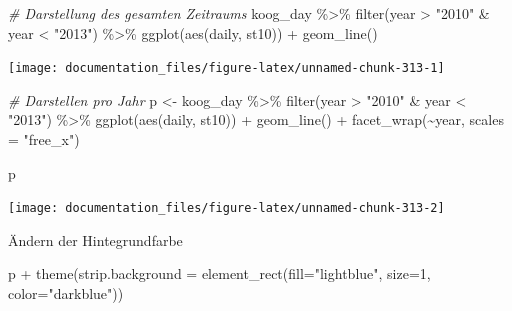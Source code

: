 \documentclass[
]{article}
\newenvironment{Shaded}{\begin{snugshade}}{\end{snugshade}}
\newcommand{\AttributeTok}[1]{\textcolor[rgb]{0.77,0.63,0.00}{#1}}
\newcommand{\CommentTok}[1]{\textcolor[rgb]{0.56,0.35,0.01}{\textit{#1}}}
\newcommand{\DecValTok}[1]{\textcolor[rgb]{0.00,0.00,0.81}{#1}}
\newcommand{\FunctionTok}[1]{\textcolor[rgb]{0.00,0.00,0.00}{#1}}
\newcommand{\NormalTok}[1]{#1}
\newcommand{\OtherTok}[1]{\textcolor[rgb]{0.56,0.35,0.01}{#1}}
\newcommand{\SpecialCharTok}[1]{\textcolor[rgb]{0.00,0.00,0.00}{#1}}
\newcommand{\StringTok}[1]{\textcolor[rgb]{0.31,0.60,0.02}{#1}}
\begin{document}
\begin{Shaded}
\begin{Highlighting}[]
\CommentTok{\# Darstellung des gesamten Zeitraums}
\NormalTok{koog\_day }\SpecialCharTok{\%\textgreater{}\%}
  \FunctionTok{filter}\NormalTok{(year }\SpecialCharTok{\textgreater{}} \StringTok{"2010"} \SpecialCharTok{\&}\NormalTok{ year }\SpecialCharTok{\textless{}} \StringTok{"2013"}\NormalTok{) }\SpecialCharTok{\%\textgreater{}\%}
  \FunctionTok{ggplot}\NormalTok{(}\FunctionTok{aes}\NormalTok{(daily, st10)) }\SpecialCharTok{+}
  \FunctionTok{geom\_line}\NormalTok{()}
\end{Highlighting}
\end{Shaded}

\begin{center}\texttt{[image: documentation\_files/figure-latex/unnamed-chunk-313-1]} \end{center}

\begin{Shaded}
\begin{Highlighting}[]

\CommentTok{\# Darstellen pro Jahr}
\NormalTok{p }\OtherTok{\textless{}{-}}\NormalTok{ koog\_day }\SpecialCharTok{\%\textgreater{}\%}
  \FunctionTok{filter}\NormalTok{(year }\SpecialCharTok{\textgreater{}} \StringTok{"2010"} \SpecialCharTok{\&}\NormalTok{ year }\SpecialCharTok{\textless{}} \StringTok{"2013"}\NormalTok{) }\SpecialCharTok{\%\textgreater{}\%}
  \FunctionTok{ggplot}\NormalTok{(}\FunctionTok{aes}\NormalTok{(daily, st10)) }\SpecialCharTok{+}
  \FunctionTok{geom\_line}\NormalTok{() }\SpecialCharTok{+}
  \FunctionTok{facet\_wrap}\NormalTok{(}\SpecialCharTok{\textasciitilde{}}\NormalTok{year, }\AttributeTok{scales =} \StringTok{"free\_x"}\NormalTok{)}

\NormalTok{p}
\end{Highlighting}
\end{Shaded}

\begin{center}\texttt{[image: documentation\_files/figure-latex/unnamed-chunk-313-2]} \end{center}

Ändern der Hintegrundfarbe

\begin{Shaded}
\begin{Highlighting}[]
\NormalTok{p }\SpecialCharTok{+} \FunctionTok{theme}\NormalTok{(}\AttributeTok{strip.background =} \FunctionTok{element\_rect}\NormalTok{(}\AttributeTok{fill=}\StringTok{"lightblue"}\NormalTok{, }\AttributeTok{size=}\DecValTok{1}\NormalTok{, }\AttributeTok{color=}\StringTok{"darkblue"}\NormalTok{))}
\end{Highlighting}
\end{Shaded}
\end{document}

